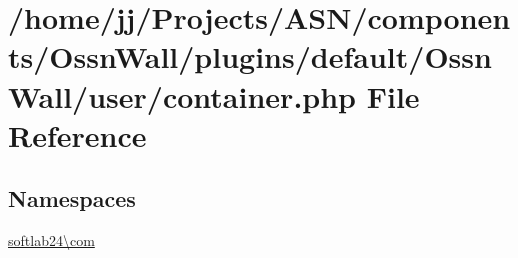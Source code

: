 \hypertarget{_ossn_wall_2user_2container_8php}{}\section{/home/jj/\+Projects/\+A\+S\+N/components/\+Ossn\+Wall/plugins/default/\+Ossn\+Wall/user/container.php File Reference}
\label{_ossn_wall_2user_2container_8php}
\subsection*{Namespaces}
\begin{DoxyCompactItemize}
\item 
 \hyperlink{namespacesoftlab24_1_1com}{softlab24\textbackslash{}com}
\end{DoxyCompactItemize}
